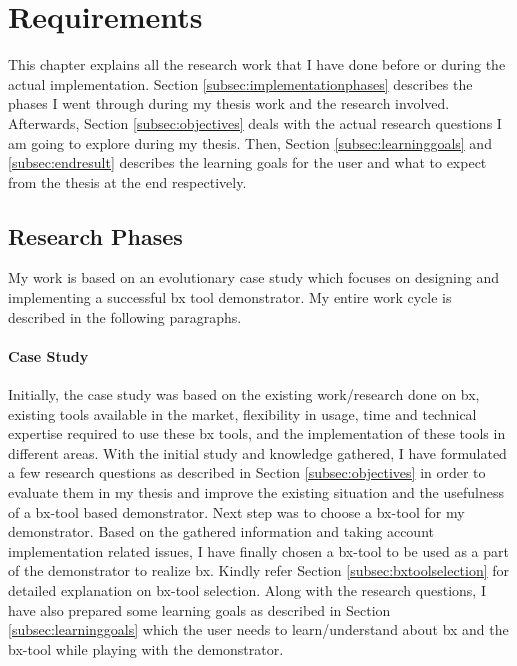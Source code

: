 \section{Requirements}\label{sec:requirements}
This chapter explains all the research work that I have done before or during the actual implementation. Section \ref{subsec:implementationphases} describes the phases I went through during my thesis work and the research involved. Afterwards, Section \ref{subsec:objectives} deals with the actual research questions I am going to explore during my thesis. Then, Section \ref{subsec:learninggoals} and \ref{subsec:endresult} describes the learning goals for the user and what to expect from the thesis at the end respectively. 

\subsection{Research Phases}\label{subsec:researchphases}
My work is based on an \ac{evolutionary case study} which focuses on designing and implementing a successful bx tool demonstrator. My entire work cycle is described in the following paragraphs.
\paragraph{Case Study}
Initially, the case study was based on the existing work/research done on bx, existing tools available in the market, flexibility in usage, time and technical expertise required to use these bx tools, and the implementation of these tools in different areas. With the initial study and knowledge gathered, I have formulated a few research questions as described in Section \ref{subsec:objectives} in order to evaluate them in my thesis and improve the existing situation and the usefulness of a bx-tool based demonstrator. 
\newline\newline Next step was to choose a bx-tool for my demonstrator. Based on the gathered information and taking account implementation related issues, I have finally chosen a bx-tool to be used as a part of the demonstrator to realize bx. Kindly refer Section \ref{subsec:bxtoolselection} for detailed explanation on bx-tool selection.
\newline\newline Along with the research questions, I have also prepared some learning goals as described in Section \ref{subsec:learninggoals} which the user needs to learn/understand about bx and the bx-tool while playing with the demonstrator.
